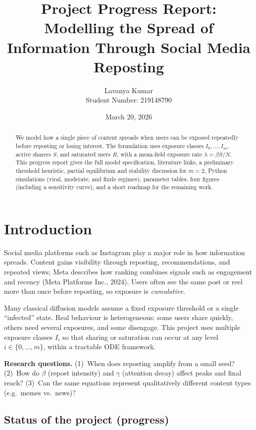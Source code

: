 \documentclass[11pt]{article}
\title{Project Progress Report:\\Modelling the Spread of Information Through Social Media Reposting}
\author{Lavanya Kumar\\Student Number: 219148790}
\date{March 20, 2026}
\begin{document}
\maketitle

\begin{abstract}
\noindent
We model how a single piece of content spreads when users can be exposed repeatedly before reposting or losing interest. The formulation uses exposure classes $I_0,\ldots,I_m$, active sharers $S$, and saturated users $R$, with a mean-field exposure rate $\lambda=\beta S/N$. This progress report gives the full model specification, literature links, a preliminary threshold heuristic, partial equilibrium and stability discussion for $m=2$, Python simulations (viral, moderate, and fizzle regimes), parameter tables, four figures (including a sensitivity curve), and a short roadmap for the remaining work.
\end{abstract}

\section{Introduction}

Social media platforms such as Instagram play a major role in how information spreads. Content gains visibility through reposting, recommendations, and repeated views; Meta describes how ranking combines signals such as engagement and recency (Meta Platforms Inc., 2024). Users often see the same post or reel more than once before reposting, so exposure is \emph{cumulative}.

Many classical diffusion models assume a fixed exposure threshold or a single ``infected'' state. Real behaviour is heterogeneous: some users share quickly, others need several exposures, and some disengage. This project uses multiple exposure classes $I_i$ so that sharing or saturation can occur at any level $i\in\{0,\ldots,m\}$, within a tractable ODE framework.

\textbf{Research questions.} (1)~When does reposting amplify from a small seed? (2)~How do $\beta$ (repost intensity) and $\gamma$ (attention decay) affect peaks and final reach? (3)~Can the same equations represent qualitatively different content types (e.g.\ memes vs.\ news)?

\subsection*{Status of the project (progress)}
\end{document}
